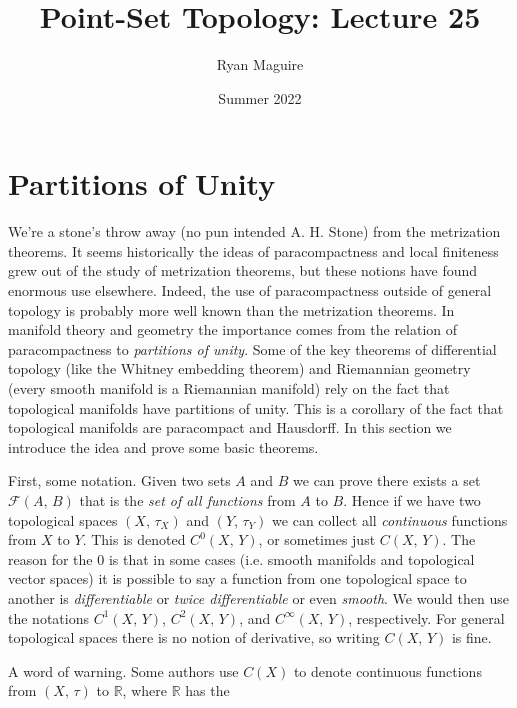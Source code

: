 \documentclass{article}
\title{Point-Set Topology: Lecture 25}
\author{Ryan Maguire}
\date{Summer 2022}
\theoremstyle{plain}
\theoremstyle{normal}
\begin{document}
    \maketitle
    \section{Partitions of Unity}
        We're a stone's throw away (no pun intended A. H. Stone) from the
        metrization theorems. It seems historically the ideas of paracompactness
        and local finiteness grew out of the study of metrization
        theorems, but these notions have found enormous use elsewhere. Indeed,
        the use of paracompactness outside of general topology is probably more
        well known than the metrization theorems. In manifold theory and
        geometry the importance comes from the relation of paracompactness to
        \textit{partitions of unity}. Some of the key theorems of differential
        topology (like the Whitney embedding theorem) and Riemannian geometry
        (every smooth manifold is a Riemannian manifold) rely on the fact that
        topological manifolds have partitions of unity. This is a corollary of
        the fact that topological manifolds are paracompact and Hausdorff. In
        this section we introduce the idea and prove some basic theorems.
        \par\hfill\par
        First, some notation. Given two sets $A$ and $B$ we can prove there
        exists a set $\mathcal{F}(A,\,B)$ that is the
        \textit{set of all functions} from $A$ to $B$. Hence if we have two
        topological spaces $(X,\,\tau_{X})$ and $(Y,\,\tau_{Y})$ we can collect
        all \textit{continuous} functions from $X$ to $Y$. This is denoted
        $C^{0}(X,\,Y)$, or sometimes just $C(X,\,Y)$. The reason for the
        $0$ is that in some cases (i.e. smooth manifolds and topological vector
        spaces) it is possible to say a function from one topological space to
        another is \textit{differentiable} or \textit{twice differentiable} or
        even \textit{smooth}. We would then use the notations
        $C^{1}(X,\,Y)$,  $C^{2}(X,\,Y)$, and $C^{\infty}(X,\,Y)$, respectively.
        For general topological spaces there is no notion
        of derivative, so writing $C(X,\,Y)$ is fine.
        \par\hfill\par
        A word of warning. Some authors use $C(X)$ to denote continuous
        functions from $(X,\,\tau)$ to $\mathbb{R}$, where $\mathbb{R}$ has the
\end{document}
